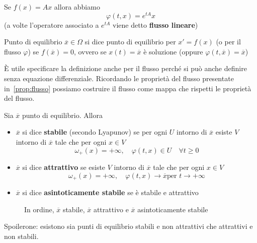 Se \(f{(x)} = Ax\) allora abbiamo
\[
    \varphi {(t, x)} = e^{tA}x
\]
(a volte l'operatore associato a \(e^{tA}\) viene detto \textbf{flusso lineare}) 

\begin{definition}{Punto di equilibrio}
    \(\overline{x} \in \Omega\) si dice punto di equilibrio per \(x'= f{(x)}\)
    (o per il flusso \(\varphi \)) se \(f{(\overline{x})} = 0\), ovvero se
    \(x{(t)} = \overline{x}\) è soluzione (oppure \(\varphi {(t, \overline{x})}
    = \overline{x}\))
\end{definition}
\begin{remark}
    È utile specificare la definizione anche per il flusso perché si può anche
    definire senza equazione differenziale. Ricordando le proprietà del flusso
    presentate in~\ref{prop:flusso} possiamo costruire il flusso come mappa che
    rispetti le proprietà del flusso.
\end{remark}
\begin{definition}
    Sia \(\overline{x}\) punto di equilibrio. Allora
\begin{itemize}[label = --]
    \item \(\overline{x}\) si dice \textbf{stabile} (secondo Lyapunov) se per
        ogni \(U\) intorno di \(\overline{x}\) esiste \(V\) intorno di
        \(\overline{x}\) tale che per ogni \(x \in V\) 
        \[
          \omega_+{(x)} = +\infty, \quad \varphi {(t, x)} \in U \quad \forall t
          \ge 0
        \]
    \item \(\overline{x}\) si dice \textbf{attrattivo} se esiste \(V\) intorno
        di \(\overline{x}\) tale che per ogni \(x \in V\) 
        \[
          \omega_+{(x)} = +\infty, \quad \varphi {(t,x)} \to \overline{x} \text{
          per } t \to +\infty
      \]
    \item \(\overline{x}\) si dice \textbf{asintoticamente stabile} se è stabile
        e attrattivo
\end{itemize}
\end{definition}
\begin{figure}[ht]
    \centering
    \caption{In ordine, \(\overline{x}\) stabile, \(\overline{x}\) attrattivo e
    \(\overline{x}\) asintoticamente stabile}\label{fig:stabilità-e-attrattività}
\end{figure}

Spoilerone: esistono sia punti di equilibrio stabili e non attrattivi che
attrattivi e non stabili.

